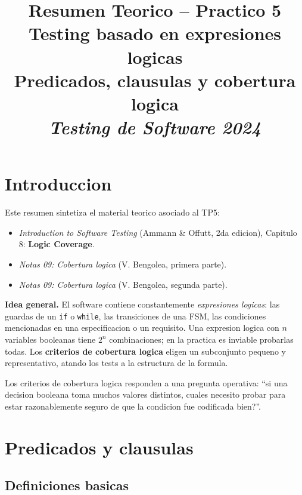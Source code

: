 \documentclass[12pt,a4paper]{article}
\title{\textbf{Resumen Teorico -- Practico 5}\\
Testing basado en expresiones logicas\\
Predicados, clausulas y cobertura logica\\
\textit{Testing de Software 2024}}
\author{}
\date{}
\begin{document}
\maketitle
\tableofcontents
\newpage

\section*{Introduccion}

Este resumen sintetiza el material teorico asociado al TP5:

\begin{itemize}
  \item \textit{Introduction to Software Testing} (Ammann \& Offutt, 2da edicion), Capitulo 8:
  \textbf{Logic Coverage}.
  \item \textit{Notas 09: Cobertura logica} (V. Bengolea, primera parte).
  \item \textit{Notas 09: Cobertura logica} (V. Bengolea, segunda parte).
\end{itemize}

\textbf{Idea general.} El software contiene constantemente \emph{expresiones logicas}: las
guardas de un \texttt{if} o \texttt{while}, las transiciones de una FSM, las condiciones
mencionadas en una especificacion o un requisito. Una expresion logica con $n$ variables
booleanas tiene $2^n$ combinaciones; en la practica es inviable probarlas todas. Los
\textbf{criterios de cobertura logica} eligen un subconjunto pequeno y representativo, atando
los tests a la estructura de la formula.

\begin{ideabox}
Los criterios de cobertura logica responden a una pregunta operativa: ``si una decision booleana
toma muchos valores distintos, \textquestiondown{}cuales necesito probar para estar razonablemente seguro de que
la condicion fue codificada bien?''.
\end{ideabox}

\section{Predicados y clausulas}

\subsection{Definiciones basicas}
\end{document}
